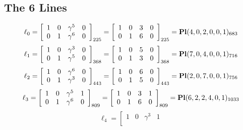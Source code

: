 \documentclass{article}
\begin{document}
{\subsection*{The 6 Lines}
$$
\ell_{0} = 
\left[
\begin{array}{*{4}{r}}
1 & 0 & \gamma^{5} & 0\\
0 & 1 & \gamma^{6} & 0\\
\end{array}
\right]
_{225}
=
\left[
\begin{array}{*{4}c}
1  & 0  & 3  & 0\\
0  & 1  & 6  & 0\\
\end{array}
\right]_{225}
={\rm\bf Pl}(4,0,2,0,0,1 )_{683}$$
$$
\ell_{1} = 
\left[
\begin{array}{*{4}{r}}
1 & 0 & \gamma^{3} & 0\\
0 & 1 & \gamma^{5} & 0\\
\end{array}
\right]
_{368}
=
\left[
\begin{array}{*{4}c}
1  & 0  & 5  & 0\\
0  & 1  & 3  & 0\\
\end{array}
\right]_{368}
={\rm\bf Pl}(7,0,4,0,0,1 )_{716}$$
$$
\ell_{2} = 
\left[
\begin{array}{*{4}{r}}
1 & 0 & \gamma^{6} & 0\\
0 & 1 & \gamma^{3} & 0\\
\end{array}
\right]
_{443}
=
\left[
\begin{array}{*{4}c}
1  & 0  & 6  & 0\\
0  & 1  & 5  & 0\\
\end{array}
\right]_{443}
={\rm\bf Pl}(2,0,7,0,0,1 )_{756}$$
$$
\ell_{3} = 
\left[
\begin{array}{*{4}{r}}
1 & 0 & \gamma^{5} & 1\\
0 & 1 & \gamma^{6} & 0\\
\end{array}
\right]
_{809}
=
\left[
\begin{array}{*{4}c}
1  & 0  & 3  & 1\\
0  & 1  & 6  & 0\\
\end{array}
\right]_{809}
={\rm\bf Pl}(6,2,2,4,0,1 )_{1033}$$
$$
\ell_{4} = 
\left[
\begin{array}{*{4}{r}}
1 & 0 & \gamma^{3} & 1\\

\end{array}$$}
\end{document}
